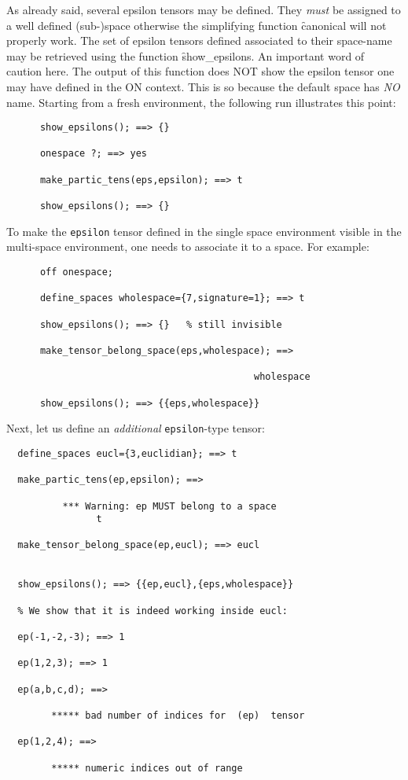 As already said, several epsilon tensors may be defined. They \emph{must}
be assigned to a well defined (sub-)space otherwise the simplifying
function \f{canonical} will not properly work.
The set of epsilon tensors defined  associated to their space-name
may be retrieved using the function
\hypertarget{operator:SHOW_EPSILONS}{\f{show\_epsilons}}.
An important word of caution here. The output of this function does NOT
show the epsilon tensor one may have defined in the ON  context.
This is so because the default space has \emph{NO} name.
Starting  from a fresh environment, the following run illustrates
this point:
\begin{verbatim}
      show_epsilons(); ==> {}

      onespace ?; ==> yes

      make_partic_tens(eps,epsilon); ==> t

      show_epsilons(); ==> {}
\end{verbatim}
To make the \texttt{epsilon} tensor defined in the single space environment
visible in the multi-space environment, one needs to associate it to
a space.
For example:
\begin{verbatim}
      off onespace;

      define_spaces wholespace={7,signature=1}; ==> t

      show_epsilons(); ==> {}   % still invisible

      make_tensor_belong_space(eps,wholespace); ==>

                                            wholespace

      show_epsilons(); ==> {{eps,wholespace}}
\end{verbatim}
Next, let us define an \emph{additional} \texttt{epsilon}-type tensor:
\begin{verbatim}
  define_spaces eucl={3,euclidian}; ==> t

  make_partic_tens(ep,epsilon); ==>

          *** Warning: ep MUST belong to a space
                t

  make_tensor_belong_space(ep,eucl); ==> eucl


  show_epsilons(); ==> {{ep,eucl},{eps,wholespace}}

  % We show that it is indeed working inside eucl:

  ep(-1,-2,-3); ==> 1

  ep(1,2,3); ==> 1

  ep(a,b,c,d); ==>

        ***** bad number of indices for  (ep)  tensor

  ep(1,2,4); ==>

        ***** numeric indices out of range
\end{verbatim}
